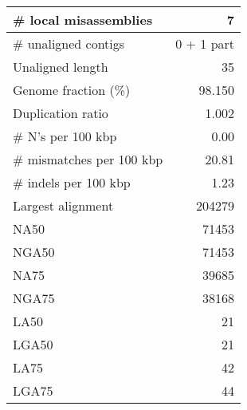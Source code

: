 \documentclass[12pt,a4paper]{article}
\begin{document}
\begin{table}[ht]
\begin{center}
\begin{tabular}{|l*{1}{|r}|}
\# local misassemblies & 7 \\ \hline
\# unaligned contigs & 0 + 1 part \\ \hline
Unaligned length & 35 \\ \hline
Genome fraction (\%) & 98.150 \\ \hline
Duplication ratio & 1.002 \\ \hline
\# N's per 100 kbp & 0.00 \\ \hline
\# mismatches per 100 kbp & 20.81 \\ \hline
\# indels per 100 kbp & 1.23 \\ \hline
Largest alignment & 204279 \\ \hline
NA50 & 71453 \\ \hline
NGA50 & 71453 \\ \hline
NA75 & 39685 \\ \hline
NGA75 & 38168 \\ \hline
LA50 & 21 \\ \hline
LGA50 & 21 \\ \hline
LA75 & 42 \\ \hline
LGA75 & 44 \\ \hline
\end{tabular}
\end{center}
\end{table}
\end{document}
